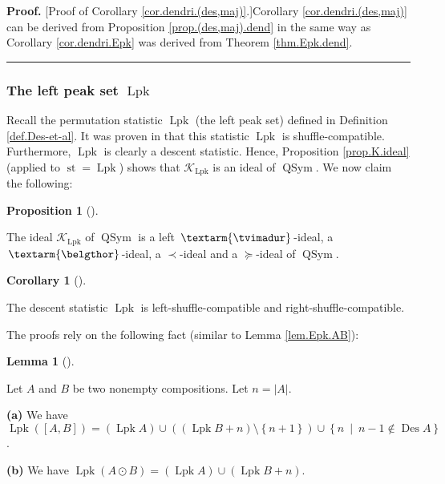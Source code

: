 \documentclass[numbers=enddot,12pt,final,onecolumn,notitlepage]{scrartcl}%
\theoremstyle{definition}
\newtheorem{lem}[theo]{Lemma}
\newenvironment{lemma}[1][]
{\begin{lem}[#1]\begin{leftbar}}
{\end{leftbar}\end{lem}}
\newtheorem{prop}[theo]{Proposition}
\newenvironment{proposition}[1][]
{\begin{prop}[#1]\begin{leftbar}}
{\end{leftbar}\end{prop}}
\newtheorem{coro}[theo]{Corollary}
\newenvironment{corollary}[1][]
{\begin{coro}[#1]\begin{leftbar}}
{\end{leftbar}\end{coro}}
\newenvironment{proof}[1][Proof]{\noindent\textbf{#1.} }{\ \rule{0.5em}{0.5em}}
\newenvironment{verlong}{}{}
\newcommand{\tvi}{\left. \textarm{\tvimadur} \right.}
\newcommand{\bel}{\left. \textarm{\belgthor} \right.}
\begin{document}
\begin{verlong}
\begin{proof}
[Proof of Corollary \ref{cor.dendri.(des,maj)}.]Corollary
\ref{cor.dendri.(des,maj)} can be derived from Proposition
\ref{prop.(des,maj).dend} in the same way as Corollary \ref{cor.dendri.Epk}
was derived from Theorem \ref{thm.Epk.dend}.
\end{proof}

\subsubsection{The left peak set $\operatorname*{Lpk}$}

Recall the permutation statistic $\operatorname*{Lpk}$ (the left peak set)
defined in Definition \ref{def.Des-et-al}. It was proven in \cite[Theorem 4.9
\textbf{(a)}]{part1} that this statistic $\operatorname*{Lpk}$ is
shuffle-compatible. Furthermore, $\operatorname*{Lpk}$ is clearly a descent
statistic. Hence, Proposition \ref{prop.K.ideal} (applied to
$\operatorname*{st}=\operatorname*{Lpk}$) shows that $\mathcal{K}%
_{\operatorname*{Lpk}}$ is an ideal of $\operatorname*{QSym}$. We now claim
the following:

\begin{proposition}
\label{prop.Lpk.dend}The ideal $\mathcal{K}_{\operatorname*{Lpk}}$ of
$\operatorname*{QSym}$ is a left $\tvi$-ideal, a $\bel$-ideal, a $\left.
\prec\right.  $-ideal and a $\left.  \succeq\right.  $-ideal of
$\operatorname*{QSym}$.
\end{proposition}

\begin{corollary}
\label{cor.dendri.Lpk}The descent statistic $\operatorname*{Lpk}$ is
left-shuffle-compatible and right-shuffle-compatible.
\end{corollary}

The proofs rely on the following fact (similar to Lemma \ref{lem.Epk.AB}):

\begin{lemma}
\label{lem.Lpk.AB}Let $A$ and $B$ be two nonempty compositions. Let
$n=\left\vert A\right\vert $.

\textbf{(a)} We have $\operatorname*{Lpk}\left(  \left[  A,B\right]  \right)
=\left(  \operatorname*{Lpk}A\right)  \cup\left(  \left(  \operatorname*{Lpk}%
B+n\right)  \setminus\left\{  n+1\right\}  \right)  \cup\left\{
n\ \mid\ n-1\notin\operatorname*{Des}A\right\}  $.

\textbf{(b)} We have $\operatorname*{Lpk}\left(  A\odot B\right)  =\left(
\operatorname*{Lpk}A\right)  \cup\left(  \operatorname*{Lpk}B+n\right)  $.
\end{lemma}


\end{verlong}
\end{document}
